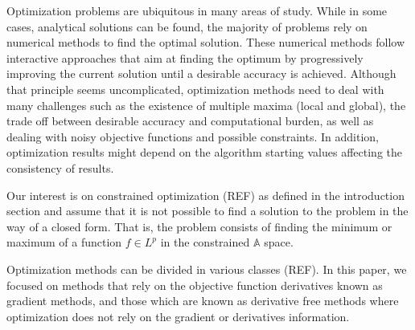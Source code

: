 Optimization problems are ubiquitous in many areas of study. While in some cases, analytical solutions can be found, the majority of problems rely on numerical methods to find the optimal solution. These numerical methods follow interactive approaches that aim at finding the optimum by progressively improving the current solution until a desirable accuracy is achieved. Although that principle seems uncomplicated, optimization methods need to deal with many challenges such as the existence of multiple maxima (local and global), the trade off between desirable accuracy and computational burden, as well as dealing with noisy objective functions and possible constraints. In addition, optimization results might depend on the algorithm starting values affecting the consistency of results.

Our interest is on constrained optimization (REF) as defined in the introduction section and assume that it is not possible to find a solution to the problem in the way of a closed form. That is, the problem consists of finding the minimum or maximum of a function \(f \in L^p\) in the constrained \(\mathbb{A}\) space.

Optimization methods can be divided in various classes (REF). In this paper, we focused on methods that rely on the objective function derivatives known as gradient methods, and those which are known as derivative free methods where optimization does not rely on the gradient or derivatives information.

